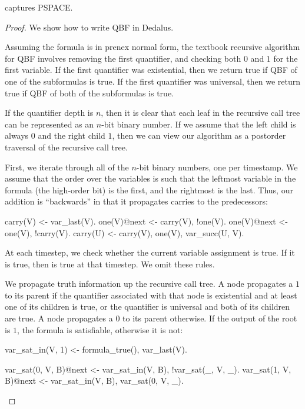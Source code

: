 \begin{lemma}
\label{lem:lang-pspace}
\lang captures PSPACE.
\end{lemma}
\begin{proof}
We show how to write QBF in Dedalus.

Assuming the formula is in prenex normal form, the textbook recursive algorithm for QBF  involves removing the first quantifier, and checking both $0$ and $1$ for the first variable.  If the first quantifier was existential, then we return true if QBF of one of the subformulas is true.  If the first quantifier was universal, then we return true if QBF of both of the subformulas is true.

If the quantifier depth is $n$, then it is clear that each leaf in the recursive call tree can be represented as an $n$-bit binary number.  If we assume that the left child is always $0$ and the right child $1$, then we can view our algorithm as a postorder traversal of the recursive call tree.

First, we iterate through all of the $n$-bit binary numbers, one per timestamp.  We assume that the order over the variables is such that the leftmost variable in the formula (the high-order bit) is the first, and the rightmost is the last.  Thus, our addition is ``backwards'' in that it propagates carries to the predecessors:

\begin{Dedalus}
carry(V) <- var_last(V).
one(V)@next <- carry(V), !one(V).
one(V)@next <- one(V), !carry(V).
carry(U) <- carry(V), one(V), var_succ(U, V).
\end{Dedalus}

At each timestep, we check whether the current variable assignment is true.  If it is true, then  is true at that timestep.  We omit these rules.

We propagate truth information up the recursive call tree.  A node propagates a $1$ to its parent if the quantifier associated with that node is existential and at least one of its children is true, or the quantifier is universal and both of its children are true.  A node propagates a $0$ to its parent otherwise.  If the output of the root is $1$, the formula is satisfiable, otherwise it is not: 

\begin{Dedalus}
var_sat_in(V, 1) <- formula_true(), var_last(V).

var_sat(0, V, B)@next <- var_sat_in(V, B),
!var_sat(_, V, _).
var_sat(1, V, B)@next <- var_sat_in(V, B),
var_sat(0, V, _).


\end{Dedalus}
\end{proof}
